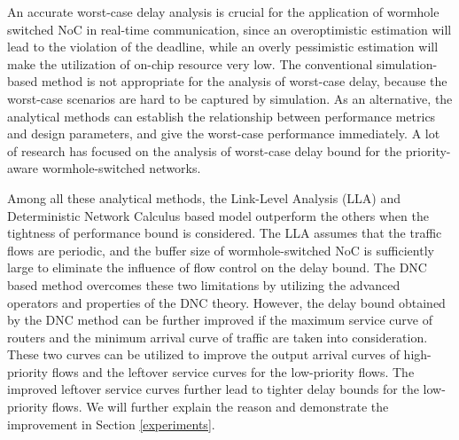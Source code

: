 \documentclass[preprint]{elsarticle}
\begin{document}
An accurate worst-case delay analysis is crucial for the application of wormhole switched NoC in real-time communication, since an overoptimistic estimation will lead to the violation of the deadline, while an overly pessimistic estimation will make the utilization of on-chip resource very low. The conventional simulation-based method is not appropriate for the analysis of worst-case delay, because the worst-case scenarios are hard to be captured by simulation. As an alternative, the analytical methods can establish the relationship between performance metrics and design parameters, and give the worst-case performance immediately. A lot of research \cite{Shi:2008:RCA:1397757.1397996,73,Qian489900,LuJS05,707545,708526,LuJS05} has focused on the analysis of worst-case delay bound for the priority-aware wormhole-switched networks.

Among all these analytical methods, the Link-Level Analysis (LLA) \cite{73} and Deterministic Network Calculus \cite{Qian489900} based model outperform the others when the tightness of performance bound is considered. The LLA assumes that the traffic flows are periodic, and the buffer size of wormhole-switched NoC is sufficiently large to eliminate the influence of flow control on the delay bound. The DNC based method \cite{Qian489900} overcomes these two limitations by utilizing the advanced operators and properties of the DNC theory. However, the delay bound obtained by the DNC method \cite{Qian489900} can be further improved if the maximum service curve of routers and the minimum arrival curve of traffic are taken into consideration. These two curves can be utilized to improve the output arrival curves of high-priority flows and the leftover service curves for the low-priority flows. The improved leftover service curves further lead to tighter delay bounds for the low-priority flows. We will further explain the reason and demonstrate the improvement in Section \ref{experiments}.
\end{document}
